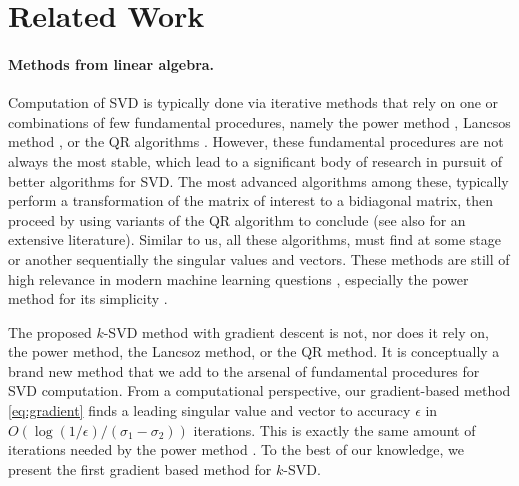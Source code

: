 \section{Related Work}\label{sec:related}


\paragraph{Methods from linear algebra.} Computation of SVD is typically done via iterative methods that rely on one or combinations of few fundamental procedures, namely the power method \cite{mises1929praktische}, Lancsos method \cite{lanczos1950iteration}, or the QR algorithms \cite{francis1961qr}. However, these fundamental procedures are not always the most stable, which lead to a significant body of research in pursuit of better algorithms for SVD. The most advanced algorithms among these, typically perform a transformation of the matrix of interest to a bidiagonal matrix, then proceed by using variants of the QR algorithm to conclude \cite{demmel1990accurate} (see also \cite{cullum2002lanczos} for an extensive literature). Similar to us, all these algorithms, must find at some stage or another sequentially the singular values and vectors. These methods are still of high relevance in modern machine learning questions \cite{arora2012stochastic,  garber2015fast, shamir2015stochastic, garber2016faster}, especially the power method for its simplicity \cite{hardt2014noisy}.


The proposed $k$-SVD method with gradient descent is not, nor does it rely on, the power  method, the Lancsoz method, or the QR method. It is conceptually a brand new method that we add to the arsenal of fundamental procedures for SVD computation. From a computational perspective, our gradient-based method \eqref{eq:gradient} finds a leading singular value and vector to accuracy $\epsilon$ in $O(\log(1/\epsilon)/(\sigma_1 - \sigma_2))$ iterations. This is exactly the same amount of iterations needed by the power method \cite{mises1929praktische}. To the best of our knowledge, we present the first gradient based method for $k$-SVD.  

